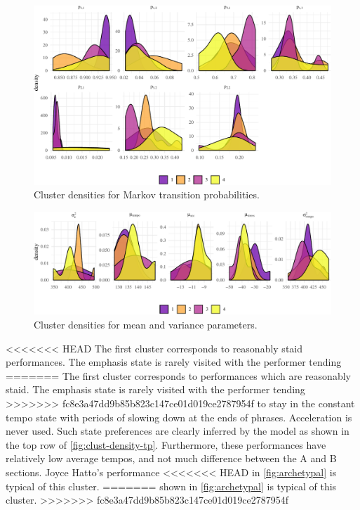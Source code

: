 \documentclass[aoas]{imsart}
\begin{document}
\begin{figure}[t]
  \centering
  \includegraphics[width=.9\linewidth]{clust-densities-sub2-1}
  \caption{Cluster densities for Markov transition probabilities.}
  \label{fig:clust-density-tp}
\end{figure}
\begin{figure}[t]
  \centering
  \includegraphics[width=.9\linewidth]{clust-densities-sub1-1}
  \caption{Cluster densities for mean and variance parameters.}
  \label{fig:clust-density-mv}
\end{figure}
<<<<<<< HEAD
The first cluster corresponds to reasonably staid performances. The emphasis state is rarely visited with the performer tending
=======
The first cluster corresponds to performances which are reasonably
staid. The emphasis state is rarely visited with the performer tending
>>>>>>> fc8e3a47dd9b85b823c147ce01d019ce2787954f
to stay in the constant tempo state with periods of slowing down at
the ends of phrases. Acceleration is never used. Such state
preferences are clearly inferred by the model as shown in the
top row of \autoref{fig:clust-density-tp}. Furthermore, these
performances have relatively low average tempos, and not much
difference between the A and B sections. Joyce Hatto's performance
<<<<<<< HEAD
in \autoref{fig:archetypal} is typical of this cluster.
=======
shown in \autoref{fig:archetypal} is typical of this cluster.
>>>>>>> fc8e3a47dd9b85b823c147ce01d019ce2787954f
\end{document}

